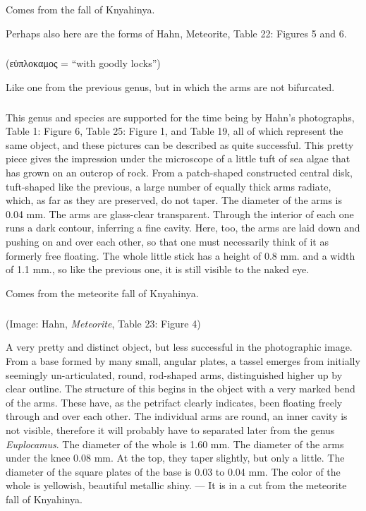 \documentclass[a4paper, 12pt, oneside]{article}
\begin{document}
Comes from the fall of Knyahinya.

Perhaps also here are the forms of Hahn, Meteorite, Table 22: Figures 5 and 6.
\subsubsection{}
\paragraph*{}
(εὐπλοκαμος = ``with goodly locks'')%

Like one from the previous genus, but in which the arms are not bifurcated.
\paragraph{\large{}}
\subparagraph{}
This genus and species are supported for the time being by Hahn's photographs, Table 1: Figure 6, Table 25: Figure 1, and Table 19, all of which represent the same object, and these pictures can be described as quite successful. This pretty piece gives the impression under the microscope of a little tuft of sea algae that has grown on an outcrop of rock. From a patch-shaped constructed central disk, tuft-shaped like the previous, a large number of equally thick arms radiate, which, as far as they are preserved, do not taper. The diameter of the arms is 0.04 mm. The arms are glass-clear transparent. Through the interior of each one runs a dark contour, inferring a fine cavity. Here, too, the arms are laid down and pushing on and over each other, so that one must necessarily think of it as formerly free floating. The whole little stick has a height of 0.8 mm. and a width of 1.1 mm., so like the previous one, it is still visible to the naked eye.

Comes from the meteorite fall of Knyahinya.
\paragraph{\large{}}
\subparagraph{}
(Image: Hahn, \emph{Meteorite}, Table 23: Figure 4)

A very pretty and distinct object, but less successful in the photographic image. From a base formed by many small, angular plates, a tassel emerges from initially seemingly un-articulated, round, rod-shaped arms, distinguished higher up by clear outline. The structure of this begins in the object with a very marked bend of the arms. These have, as the petrifact clearly indicates, been floating freely through and over each other. The individual arms are round, an inner cavity is not visible, therefore it will probably have to separated later from the genus \emph{Euplocamus}. The diameter of the whole is 1.60 mm. The diameter of the arms under the knee 0.08 mm. At the top, they taper slightly, but only a little. The diameter of the square plates of the base is 0.03 to 0.04 mm. The color of the whole is yellowish, beautiful metallic shiny. --- It is in a cut from the meteorite fall of Knyahinya.
\end{document}
